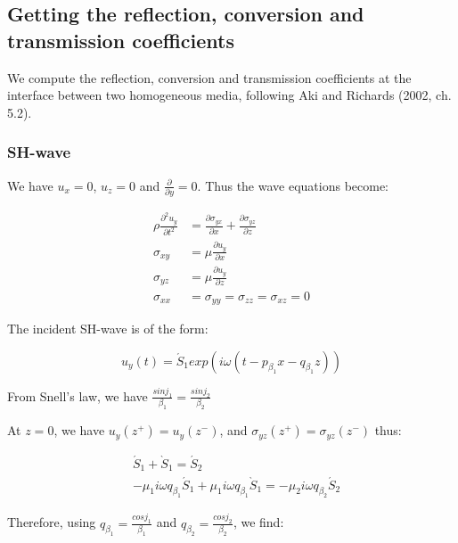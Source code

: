 \documentclass[workdone.tex]{subfiles}
\begin{document}
\subsection{Getting the reflection, conversion and transmission coefficients}

We compute the reflection, conversion and transmission coefficients at the interface between two homogeneous media, following Aki and Richards (2002, ch. 5.2).

\subsubsection{SH-wave}

We have $u_x = 0$, $u_z = 0$ and $\frac{\partial}{\partial y} = 0$. Thus the wave equations become:

\begin{equation}
\begin{split}
\rho \frac{\partial ^2 u_y}{\partial t^2} & = \frac{\partial \sigma_{yx}}{\partial x} + \frac{\partial \sigma_{yz}}{\partial z} \\
\sigma_{xy} & = \mu \frac{\partial u_y}{\partial x} \\
\sigma_{yz} & = \mu \frac{\partial u_y}{\partial z} \\
\sigma_{xx} & = \sigma_{yy} = \sigma_{zz} = \sigma_{xz} = 0
\end{split}
\end{equation}

The incident SH-wave is of the form:

\begin{equation}
u_y (t) = \acute S_1 exp (i \omega (t - p_{\beta_1} x - q_{\beta_1} z))
\end{equation}

From Snell's law, we have $\frac{sin j_1}{\beta_1} = \frac{sin j_2}{\beta_2}$

At $z = 0$, we have $u_y (z^+) = u_y (z^-)$, and $\sigma_{yz} (z^+) = \sigma_{yz} (z^-)$ thus:

\begin{equation}
\begin{split}
& \acute S_1 + \grave S_1 = \acute S_2 \\
& - \mu_1 i \omega q_{\beta_1} \acute S_1 + \mu_1 i \omega q_{\beta_1} \grave S_1 = - \mu_2 i \omega q_{\beta_2} \acute S_2
\end{split}
\end{equation}

Therefore, using $q_{\beta_1} = \frac{cos j_1}{\beta_1}$ and $q_{\beta_2} = \frac{cos j_2}{\beta_2}$, we find:
\end{document}
